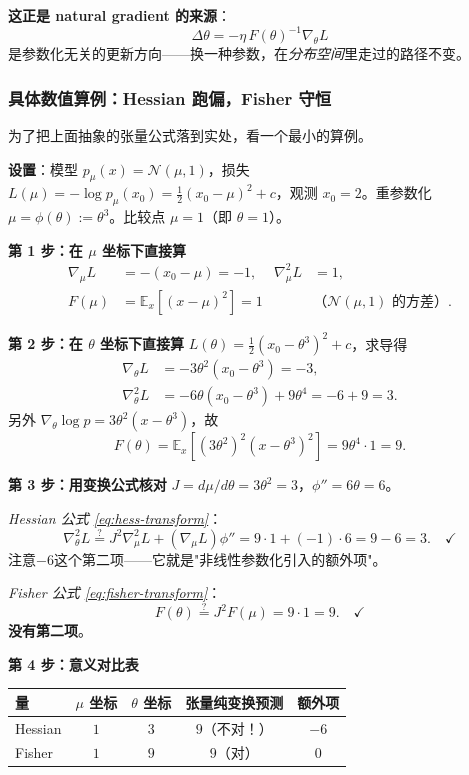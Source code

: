 \documentclass[11pt,a4paper]{article}
\theoremstyle{mythm}
\theoremstyle{mydef}
\newcommand{\E}{\mathbb{E}}
\begin{document}
\textbf{这正是 natural gradient 的来源}：
$$\Delta\theta = -\eta\, F(\theta)^{-1}\nabla_\theta L$$
是参数化无关的更新方向——换一种参数，在\emph{分布空间}里走过的路径不变。

\subsubsection*{具体数值算例：Hessian 跑偏，Fisher 守恒}

为了把上面抽象的张量公式落到实处，看一个最小的算例。

\textbf{设置}：模型 $p_\mu(x) = \mathcal{N}(\mu, 1)$，损失 $L(\mu) = -\log p_\mu(x_0) = \tfrac{1}{2}(x_0-\mu)^2 + c$，观测 $x_0 = 2$。重参数化 $\mu = \phi(\theta) := \theta^3$。比较点 $\mu = 1$（即 $\theta = 1$）。

\textbf{第 1 步：在 $\mu$ 坐标下直接算}
\begin{align*}
\nabla_\mu L &= -(x_0 - \mu) = -1, & \nabla^2_\mu L &= 1, \\
F(\mu) &= \E_x[(x-\mu)^2] = 1 & &\text{（$\mathcal{N}(\mu,1)$ 的方差）}.
\end{align*}

\textbf{第 2 步：在 $\theta$ 坐标下直接算}
$L(\theta) = \tfrac{1}{2}(x_0 - \theta^3)^2 + c$，求导得
\begin{align*}
\nabla_\theta L &= -3\theta^2(x_0 - \theta^3) = -3, \\
\nabla^2_\theta L &= -6\theta(x_0 - \theta^3) + 9\theta^4 = -6 + 9 = \boxed{3}.
\end{align*}
另外 $\nabla_\theta \log p = 3\theta^2(x-\theta^3)$，故
$$F(\theta) = \E_x[(3\theta^2)^2(x-\theta^3)^2] = 9\theta^4 \cdot 1 = \boxed{9}.$$

\textbf{第 3 步：用变换公式核对}
$J = d\mu/d\theta = 3\theta^2 = 3$，$\phi'' = 6\theta = 6$。

\emph{Hessian 公式 \eqref{eq:hess-transform}}：
$$\nabla^2_\theta L \stackrel{?}{=} J^2\nabla^2_\mu L + (\nabla_\mu L)\phi'' = 9\cdot 1 + (-1)\cdot 6 = 9 - 6 = 3.\quad\checkmark$$
注意$\boxed{-6}$这个第二项——它就是"非线性参数化引入的额外项"。

\emph{Fisher 公式 \eqref{eq:fisher-transform}}：
$$F(\theta) \stackrel{?}{=} J^2 F(\mu) = 9\cdot 1 = 9.\quad\checkmark$$
\textbf{没有第二项}。

\textbf{第 4 步：意义对比表}

\begin{center}
\begin{tabular}{l|cccc}
\hline
量 & $\mu$ 坐标 & $\theta$ 坐标 & 张量纯变换预测 & 额外项 \\\hline
Hessian & $1$ & $3$ & $9$（不对！） & $-6$ \\
Fisher  & $1$ & $9$ & $9$（对） & $0$ \\
\hline
\end{tabular}
\end{center}
\end{document}
